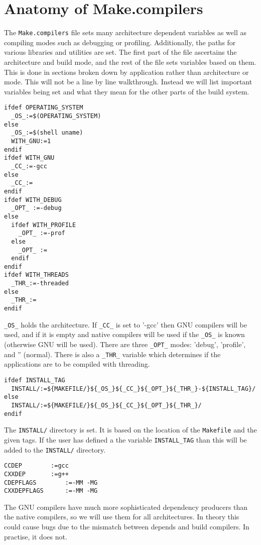 \documentclass{article}
\begin{document}
\section{Anatomy of Make.compilers}

The \verb+Make.compilers+ file sets many architecture dependent
variables as well as compiling modes such as debugging or profiling.
Additionally, the paths for various libraries and utilities are set.
The first part of the file ascertains the architecture and build mode,
and the rest of the file sets variables based on them.  This is done
in sections broken down by application rather than architecture or
mode.  This will not be a line by line walkthrough.  Instead we will
list important variables being set and what they mean for the other
parts of the build system.

\begin{verbatim}
ifdef OPERATING_SYSTEM
  _OS_:=$(OPERATING_SYSTEM)
else
  _OS_:=$(shell uname)
  WITH_GNU:=1
endif
ifdef WITH_GNU
  _CC_:=-gcc
else
  _CC_:=
endif
ifdef WITH_DEBUG
  _OPT_ :=-debug
else
  ifdef WITH_PROFILE
    _OPT_ :=-prof
  else
    _OPT_ :=
  endif
endif
ifdef WITH_THREADS
  _THR_:=-threaded
else
  _THR_:=
endif
\end{verbatim}
\verb+_OS_+ holds the architecture.  If \verb+_CC_+ is set to '-gcc'
then GNU compilers will be used, and if it is empty and native
compilers will be used if the \verb+_OS_+ is known (otherwise GNU
will be used).  There are three \verb+_OPT_+ modes: 'debug', 'profile',
and '' (normal).  There is also a \verb+_THR_+ variable which determines
if the applications are to be compiled with threading.

\begin{verbatim}
ifdef INSTALL_TAG
  INSTALL/:=${MAKEFILE/}${_OS_}${_CC_}${_OPT_}${_THR_}-${INSTALL_TAG}/
else
  INSTALL/:=${MAKEFILE/}${_OS_}${_CC_}${_OPT_}${_THR_}/
endif
\end{verbatim}
The \verb+INSTALL/+ directory is set.  It is based on the location
of the \verb+Makefile+ and the given tags.
If the user has defined a the variable \verb+INSTALL_TAG+ than this
will be added to the \verb+INSTALL/+ directory.

\begin{verbatim}
CCDEP		 :=gcc
CXXDEP		 :=g++
CDEPFLAGS        :=-MM -MG
CXXDEPFLAGS      :=-MM -MG
\end{verbatim}
The GNU compilers have much more sophisticated dependency producers than
the native compilers, so we will use them for all architectures.  In
theory this could cause bugs due to the mismatch between depends and
build compilers.  In practise, it does not.
\end{document}
